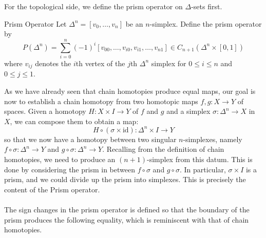 \documentclass[a4paper]{article}
\begin{document}
For the topological side, we define the prism operator on $\Delta$-sets first. 

\begin{defn}{Prism Operator}{} Let $\Delta^n=[v_0,\dots,v_n]$ be an $n$-simplex. Define the prism operator by $$P(\Delta^n)=\sum_{i=0}^n(-1)^i[v_{00},\dots,v_{i0},v_{i1},\dots,v_{n1}]\in C_{n+1}(\Delta^n\times[0,1])$$ where $v_{ij}$ denotes the $i$th vertex of the $j$th $\Delta^n$ simplex for $0\leq i\leq n$ and $0\leq j\leq 1$. 
\end{defn}

As we have already seen that chain homotopies produce equal maps, our goal is now to establish a chain homotopy from two homotopic maps $f,g:X\to Y$ of spaces. Given a homotopy $H:X\times I\to Y$ of $f$ and $g$ and a simplex $\sigma:\Delta^n\to X$ in $X$, we can compose them to obtain a map: $$H\circ(\sigma\times\text{id}):\Delta^n\times I\to Y$$ so that we now have a homotopy between two singular $n$-simplexes, namely $f\circ\sigma:\Delta^n\to Y$ and $g\circ\sigma:\Delta^n\to Y$. Recalling from the definition of chain homotopies, we need to produce an $(n+1)$-simplex from this datum. This is done by considering the prism in between $f\circ\sigma$ and $g\circ\sigma$. In particular, $\sigma\times I$ is a prism, and we could divide up the prism into simplexes. This is precisely the content of the Prism operator. \\~\\

The sign changes in the prism operator is defined so that the boundary of the prism produces the following equality, which is reminiscent with that of chain homotopies. 
\end{document}
